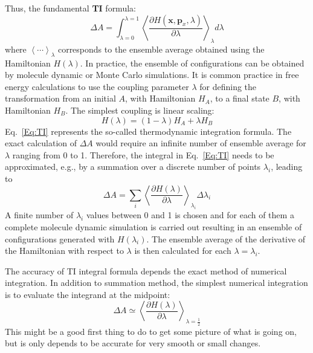 Thus, the fundamental \textbf{TI} formula:
\begin{equation}
\Delta A = \int_{\lambda=0}^{\lambda=1}\left \langle \frac{\partial{H(\textbf{x},\textbf{p}_{x},\lambda)}}{\partial{\lambda}} \right \rangle_{\lambda} d\lambda
\label{Eq:TI}
\end{equation} 
where $\left \langle \cdots \right \rangle _{\lambda}$ corresponds to the ensemble average obtained using the Hamiltonian $H(\lambda)$. In practice, the ensemble of configurations can be obtained by molecule dynamic or Monte Carlo simulations. It is common practice in free energy calculations to use the coupling parameter $\lambda$ for defining the transformation from an initial $A$, with Hamiltonian $H_{A}$, to a final state $B$, with Hamiltonian $H_{B}$. The simplest coupling is linear scaling:
\begin{equation}
H(\lambda) = (1-\lambda) H_{A} + \lambda H_{B}
\end{equation}
Eq.~\ref{Eq:TI} represents the so-called thermodynamic integration formula. The exact calculation of $\Delta A$ would require an infinite number of ensemble average for $\lambda$ ranging from 0 to 1.
Therefore, the integral in Eq.~\ref{Eq:TI} needs to be approximated, e.g., by a summation over a discrete number of points $\lambda_{i}$, \cite{MordasiniJPCB2000} leading to 
\begin{equation}
\Delta A = \sum_{i}^{}\left \langle \frac{\partial{H(\lambda)}}{\partial{\lambda}} \right \rangle_{\lambda_{i}} \Delta\lambda_{i}
\label{Eq:dTI}
\end{equation} 
A finite number of $\lambda_{i}$ values between 0 and 1 is chosen and for each of them a complete molecule dynamic simulation is carried out resulting in an ensemble of configurations generated with $H(\lambda_{i})$.
The ensemble average of the derivative of the Hamiltonian with respect to $\lambda$ is then calculated for each $\lambda = \lambda_{i}$.
	
The accuracy of TI integral formula depends the exact method of numerical integration. In addition to summation method, the simplest numerical integration is to evaluate the integrand at the midpoint:
\begin{equation}
\Delta A \simeq \left \langle \frac{\partial{H(\lambda)}}{\partial{\lambda}} \right \rangle_{\lambda=\frac{1}{2}}
\label{Eq:TI1}
\end{equation} 
This might be a good first thing to do to get some picture of what is going on, but is only depends to be accurate for very smooth or small changes. %
	
